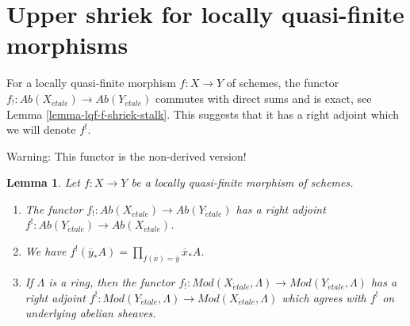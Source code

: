 \documentclass{stacks-project}
\theoremstyle{plain}
\newtheorem{lemma}[subsection]{Lemma}
\theoremstyle{definition}
\theoremstyle{remark}
\numberwithin{equation}{subsection}
\def\etale{{\acute{e}tale}}
\begin{document}
\section{Upper shriek for locally quasi-finite morphisms}
\label{section-duality-locally-quasi-finite}

\noindent
For a locally quasi-finite morphism $f : X \to Y$ of schemes, the
functor $f_! : \textit{Ab}(X_\etale) \to \textit{Ab}(Y_\etale)$ commutes
with direct sums and is exact, see Lemma \ref{lemma-lqf-f-shriek-stalk}.
This suggests that it has a right adjoint which we will denote $f^!$.

\medskip\noindent
Warning: This functor is the non-derived version!

\begin{lemma}
\label{lemma-lqf-f-upper-shriek}
Let $f : X \to Y$ be a locally quasi-finite morphism of schemes.
\begin{enumerate}
\item The functor $f_! : \textit{Ab}(X_\etale) \to \textit{Ab}(Y_\etale)$
has a right adjoint $f^! : \textit{Ab}(Y_\etale) \to \textit{Ab}(X_\etale)$.
\item We have
$f^!(\overline{y}_*A) = \prod_{f(\overline{x}) = \overline{y}} \overline{x}_*A$.
\item If $\Lambda$ is a ring, then the functor
$f_! : \textit{Mod}(X_\etale, \Lambda) \to \textit{Mod}(Y_\etale, \Lambda)$
has a right adjoint
$f^! : \textit{Mod}(Y_\etale, \Lambda) \to \textit{Mod}(X_\etale, \Lambda)$
which agrees with $f^!$ on underlying abelian sheaves.
\end{enumerate}
\end{lemma}
\end{document}

